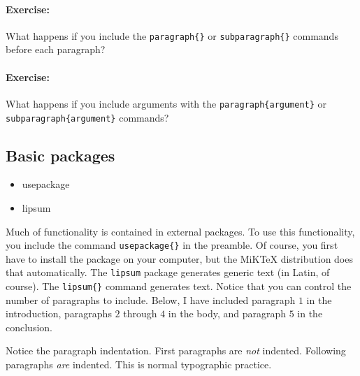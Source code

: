         \paragraph{Exercise:}What happens if you include the \texttt{paragraph\{\}} or \texttt{subparagraph\{\}} commands before each paragraph? 
        
        \paragraph{Exercise:}What happens if you include arguments with the \texttt{paragraph\{argument\}} or \texttt{subparagraph\{argument\}} commands? 

        \subsection{Basic packages}
        \label{Basic packages}
        
        \begin{framed}
            \begin{itemize}
                \item{usepackage}
                \item{lipsum}
            \end{itemize}
        \end{framed}

Much of \LaTeXe{} functionality is contained in external packages. To use this functionality, you include the command \texttt{usepackage\{\}} in the preamble. Of course, you first have to install the package on your computer, but the MiKTeX distribution does that automatically. The \texttt{lipsum} package generates generic text (in Latin, of course). The \texttt{lipsum\{\}} command generates text. Notice that you can control the number of paragraphs to include. Below, I have included paragraph $1$ in the introduction, paragraphs $2$ through $4$ in the body, and paragraph $5$ in the conclusion.

Notice the paragraph indentation. First paragraphs are \textit{not} indented. Following paragraphs \textit{are} indented. This is normal typographic practice.

